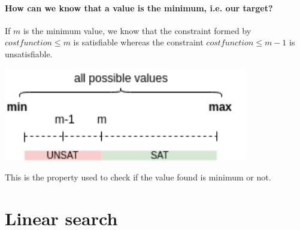 \paragraph{How can we know that a value is the minimum, i.e. our target?\\}
If $m$ is the minimum value, we know that the constraint formed by $cost function \leq m$ is satisfiable whereas the constraint $cost function \leq m-1$ is unsatisfiable.\\
\begin{center}
	\includegraphics[width=0.8\textwidth]{Figures/SearchSpace2.png}
	\label{search_space_2}
\end{center}
This is the property used to check if the value found is minimum or not.

\section{Linear search}

